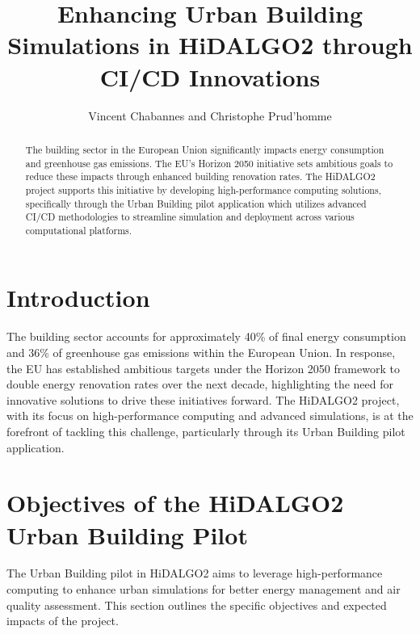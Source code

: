 \documentclass[runningheads]{llncs}
\begin{document}
\title{Enhancing Urban Building Simulations in HiDALGO2 through CI/CD Innovations}
\author{Vincent Chabannes  and Christophe Prud'homme}


\maketitle

\begin{abstract}
The building sector in the European Union significantly impacts energy consumption and greenhouse gas emissions. The EU's Horizon 2050 initiative sets ambitious goals to reduce these impacts through enhanced building renovation rates. The HiDALGO2 project supports this initiative by developing high-performance computing solutions, specifically through the Urban Building pilot application which utilizes advanced CI/CD methodologies to streamline simulation and deployment across various computational platforms.
\end{abstract}

\section{Introduction}
The building sector accounts for approximately 40\% of final energy consumption and 36\% of greenhouse gas emissions within the European Union. In response, the EU has established ambitious targets under the Horizon 2050 framework to double energy renovation rates over the next decade, highlighting the need for innovative solutions to drive these initiatives forward. The HiDALGO2 project, with its focus on high-performance computing and advanced simulations, is at the forefront of tackling this challenge, particularly through its Urban Building pilot application.

\section{Objectives of the HiDALGO2 Urban Building Pilot}
The Urban Building pilot in HiDALGO2 aims to leverage high-performance computing to enhance urban simulations for better energy management and air quality assessment. This section outlines the specific objectives and expected impacts of the project.
\end{document}
